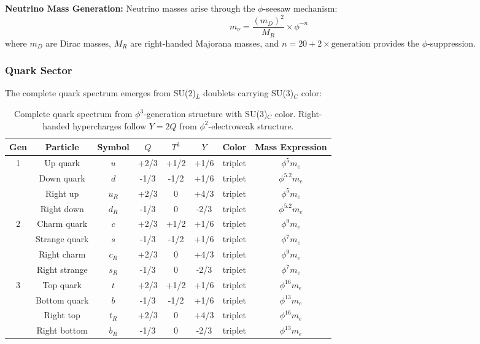 \textbf{Neutrino Mass Generation:}
Neutrino masses arise through the $\phi$-seesaw mechanism:
\begin{equation}
m_\nu = \frac{(m_D)^2}{M_R} \times \phi^{-n}
\end{equation}
where $m_D$ are Dirac masses, $M_R$ are right-handed Majorana masses, and $n = 20 + 2 \times \text{generation}$ provides the $\phi$-suppression.

\subsubsection{Quark Sector}

The complete quark spectrum emerges from SU(2)$_L$ doublets carrying SU(3)$_C$ color:

\begin{table}[H]
\centering
\begin{tabular}{|c|c|c|c|c|c|c|c|}
\hline
\textbf{Gen} & \textbf{Particle} & \textbf{Symbol} & \textbf{$Q$} & \textbf{$T^3$} & \textbf{$Y$} & \textbf{Color} & \textbf{Mass Expression} \\
\hline
\multirow{4}{*}{1} & Up quark & $u$ & +2/3 & +1/2 & +1/6 & triplet & $\phi^5 m_e$ \\
& Down quark & $d$ & -1/3 & -1/2 & +1/6 & triplet & $\phi^{5.2} m_e$ \\
& Right up & $u_R$ & +2/3 & 0 & +4/3 & triplet & $\phi^5 m_e$ \\
& Right down & $d_R$ & -1/3 & 0 & -2/3 & triplet & $\phi^{5.2} m_e$ \\
\hline
\multirow{4}{*}{2} & Charm quark & $c$ & +2/3 & +1/2 & +1/6 & triplet & $\phi^9 m_e$ \\
& Strange quark & $s$ & -1/3 & -1/2 & +1/6 & triplet & $\phi^7 m_e$ \\
& Right charm & $c_R$ & +2/3 & 0 & +4/3 & triplet & $\phi^9 m_e$ \\
& Right strange & $s_R$ & -1/3 & 0 & -2/3 & triplet & $\phi^7 m_e$ \\
\hline
\multirow{4}{*}{3} & Top quark & $t$ & +2/3 & +1/2 & +1/6 & triplet & $\phi^{16} m_e$ \\
& Bottom quark & $b$ & -1/3 & -1/2 & +1/6 & triplet & $\phi^{13} m_e$ \\
& Right top & $t_R$ & +2/3 & 0 & +4/3 & triplet & $\phi^{16} m_e$ \\
& Right bottom & $b_R$ & -1/3 & 0 & -2/3 & triplet & $\phi^{13} m_e$ \\
\hline
\end{tabular}
\caption{Complete quark spectrum from $\phi^3$-generation structure with SU(3)$_C$ color. Right-handed hypercharges follow $Y = 2Q$ from $\phi^2$-electroweak structure.}
\end{table}

